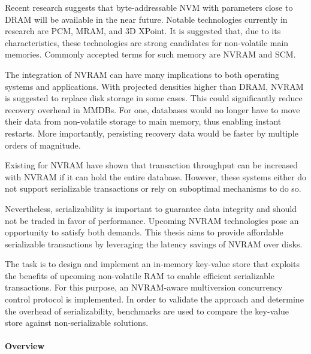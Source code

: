 
Recent research suggests that byte-addressable \ac{NVM} with parameters close to
\ac{DRAM} will be available in the near future. Notable technologies currently
in research are \ac{PCM}, \ac{MRAM}, and 3D XPoint. It is suggested that, due to
its characteristics, these technologies are strong candidates for non-volatile
main memories. Commonly accepted terms for such memory are \ac{NVRAM} and
\ac{SCM}.


The integration of \ac{NVRAM} can have many implications to both operating
systems and applications. With projected densities higher than \ac{DRAM},
\ac{NVRAM} is suggested to replace disk storage in some cases. This could
significantly reduce recovery overhead in \acp{MMDB}. For one, databases would
no longer have to move their data from non-volatile storage to main memory, thus
enabling instant restarts. More importantly, persisting recovery data would be
faster by multiple orders of magnitude.

Existing \kvsp for \ac{NVRAM} have shown that transaction throughput can be
increased with \ac{NVRAM} if it can hold the entire database. However, these
systems either do not support serializable transactions or rely on suboptimal
mechanisms to do so.

Nevertheless, serializability is important to guarantee data integrity and
should not be traded in favor of performance. Upcoming NVRAM technologies pose
an opportunity to satisfy both demands. This thesis aims to provide affordable
serializable transactions by leveraging the latency savings of \ac{NVRAM} over
disks.



The task is to design and implement an in-memory key-value store that exploits
the benefits of upcoming non-volatile RAM to enable efficient serializable
transactions. For this purpose, an NVRAM-aware multiversion concurrency control
protocol is implemented. In order to validate the approach and determine the
overhead of serializability, benchmarks are used to compare the key-value store
against non-serializable solutions.


\paragraph{Overview}

